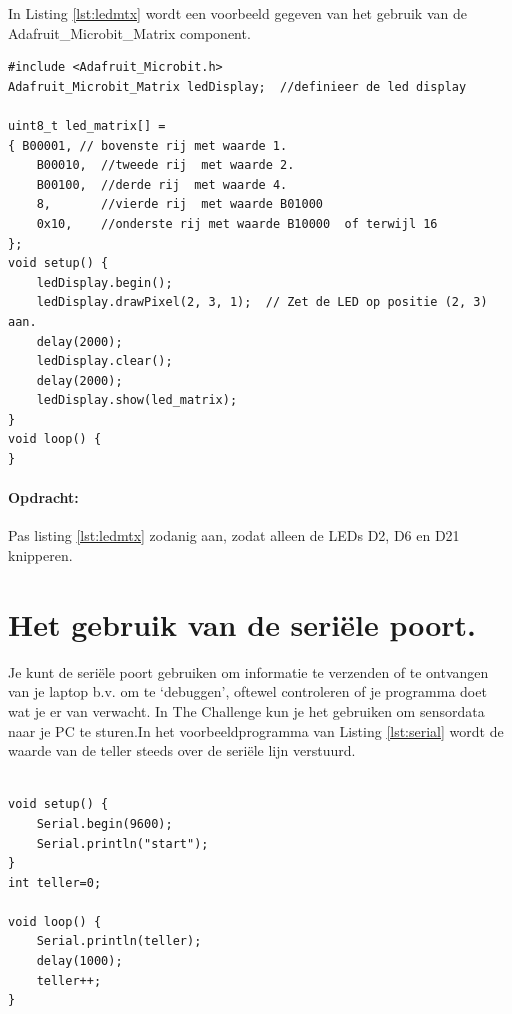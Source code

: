 In Listing \ref{lst:ledmtx} wordt een voorbeeld gegeven van het gebruik van de Adafruit\_Microbit\_Matrix component.

\begin{lstlisting}[caption= Een LED matrix demo,label={lst:ledmtx},firstnumber=1]		
#include <Adafruit_Microbit.h>
Adafruit_Microbit_Matrix ledDisplay;  //definieer de led display

uint8_t led_matrix[] =
{ B00001, // bovenste rij met waarde 1.
	B00010,  //tweede rij  met waarde 2.
	B00100,  //derde rij  met waarde 4.
	8,       //vierde rij  met waarde B01000
	0x10,    //onderste rij met waarde B10000  of terwijl 16
};
void setup() {
	ledDisplay.begin(); 
	ledDisplay.drawPixel(2, 3, 1);  // Zet de LED op positie (2, 3) aan.
	delay(2000);  
	ledDisplay.clear();  
	delay(2000);  
	ledDisplay.show(led_matrix);
}
void loop() {
}
\end{lstlisting}

\paragraph{Opdracht: }Pas listing \ref{lst:ledmtx} zodanig aan, zodat alleen de LEDs D2, D6 en D21 knipperen.


\section{Het gebruik van de seriële poort.}

Je kunt de seriële poort gebruiken om informatie te verzenden of te ontvangen van je laptop b.v. om te ‘debuggen’, oftewel controleren of je programma doet wat je er van verwacht. In The Challenge kun je het gebruiken om sensordata naar je PC te sturen.In het voorbeeldprogramma van Listing \ref{lst:serial} wordt de waarde van de teller steeds over de seriële lijn verstuurd.

\begin{lstlisting}[caption= Een LED matrix demo,label={lst:serial},firstnumber=1]		
	
void setup() {
	Serial.begin(9600);
	Serial.println("start");
}
int teller=0;

void loop() {
	Serial.println(teller);
	delay(1000);
	teller++;
}
\end{lstlisting}


